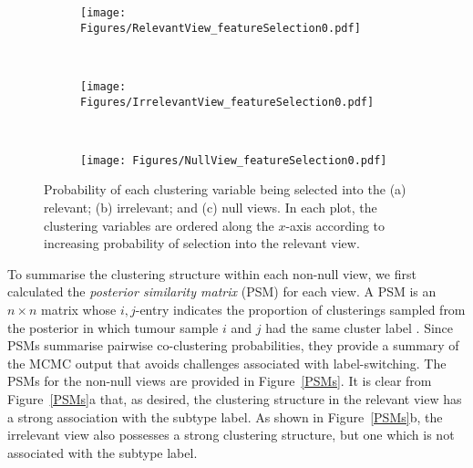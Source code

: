 \documentclass[12pt]{article}
\begin{document}
\begin{figure}[!ht]\centering
    \begin{subfigure}[b]{0.31\textwidth}\centering
{\texttt{[image: Figures/RelevantView\_featureSelection0.pdf]}}
\caption{}%
    \end{subfigure}
    ~
    \begin{subfigure}[b]{0.31\textwidth}\centering
{\texttt{[image: Figures/IrrelevantView\_featureSelection0.pdf]}}
\caption{}%
    \end{subfigure}
    ~
    \begin{subfigure}[b]{0.31\textwidth}\centering
{\texttt{[image: Figures/NullView\_featureSelection0.pdf]}}
\caption{}%
    \end{subfigure}
    \caption{Probability of each clustering variable being selected into the (a) relevant; (b) irrelevant; and (c) null views.  In each plot, the clustering variables are ordered  along the $x$-axis according to increasing probability of selection into the relevant view.}\label{selectionProbs}
\end{figure}

To summarise the clustering structure within each non-null view, we first calculated the {\em posterior similarity matrix} (PSM) for each view.  A PSM is an $n \times n$ matrix whose $i,j$-entry indicates the proportion of clusterings sampled from the posterior in which tumour sample $i$ and $j$ had the same cluster label \citep{Fritsch2009}.  Since PSMs summarise pairwise co-clustering probabilities, they provide a summary of the MCMC output that avoids challenges associated with label-switching.  The PSMs for the non-null views are provided in Figure~\ref{PSMs}.  It is clear from Figure~\ref{PSMs}a that, as desired, the clustering structure in the relevant view has a strong association with the subtype label.  As shown in Figure~\ref{PSMs}b, the irrelevant view also possesses a strong clustering structure, but one which is not associated with the subtype label. 
\end{document}
